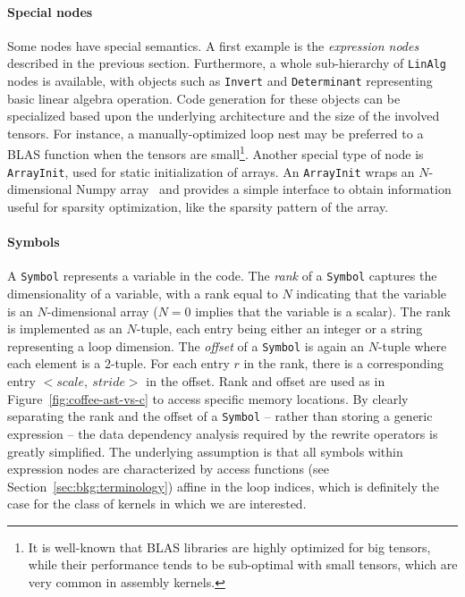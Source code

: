 \paragraph{Special nodes}
Some nodes have special semantics. A first example is the {\it expression nodes} described in the previous section. Furthermore, a whole sub-hierarchy of \texttt{LinAlg} nodes is available, with objects such as \texttt{Invert} and \texttt{Determinant} representing basic linear algebra operation. Code generation for these objects can be specialized based upon the underlying architecture and the size of the involved tensors. For instance, a manually-optimized loop nest may be preferred to a BLAS function when the tensors are small\footnote{It is well-known that BLAS libraries are highly optimized for big tensors, while their performance tends to be sub-optimal with small tensors, which are very common in assembly kernels.}. Another special type of node is \texttt{ArrayInit}, used for static initialization of arrays. An \texttt{ArrayInit} wraps an $N$-dimensional Numpy array~\citep{Numpy} and provides a simple interface to obtain information useful for sparsity optimization, like the sparsity pattern of the array. 

\paragraph{Symbols}
A \texttt{Symbol} represents a variable in the code. The \textit{rank} of a \texttt{Symbol} captures the dimensionality of a variable, with a rank equal to $N$ indicating that the variable is an $N$-dimensional array ($N=0$ implies that the variable is a scalar). The rank is implemented as an $N$-tuple, each entry being either an integer or a string representing a loop dimension. The \textit{offset} of a \texttt{Symbol} is again an $N$-tuple where each element is a 2-tuple. For each entry $r$ in the rank, there is a corresponding entry ${<}scale,\ stride{>}$ in the offset. Rank and offset are used as in Figure~\ref{fig:coffee-ast-vs-c} to access specific memory locations. By clearly separating the rank and the offset of a \texttt{Symbol} -- rather than storing a generic expression -- the data dependency analysis required by the rewrite operators is greatly simplified. The underlying assumption is that all symbols within expression nodes are characterized by access functions (see Section~\ref{sec:bkg:terminology}) affine in the loop indices, which is definitely the case for the class of kernels in which we are interested.

